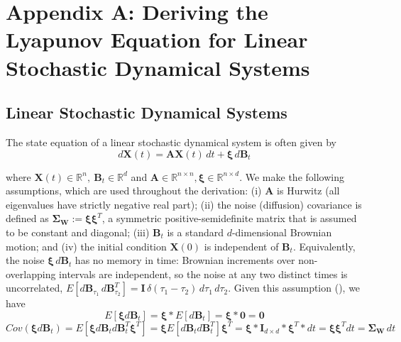 \documentclass{article}
\begin{document}

\section*{Appendix A: Deriving the Lyapunov Equation for Linear Stochastic Dynamical Systems}
\label{app:appA}
\renewcommand{\theequation}{A-\arabic{equation}}
\setcounter{equation}{0}

\subsection*{Linear Stochastic Dynamical Systems}
%
The state equation of a linear stochastic dynamical system is often given by
\begin{equation}
d \mathbf{X}(t) = \mathbf{A} \mathbf{X}(t)\, dt + \boldsymbol{\xi} \, d\mathbf{B}_t
\label{eq:lds_state_eq}
\end{equation}

where $\mathbf{X}(t) \in \mathbb{R}^n,\ \mathbf{B}_t \in \mathbb{R}^d$ and
$\mathbf{A} \in \mathbb{R}^{n \times n} , \boldsymbol{\xi} \in \mathbb{R}^{n \times d}$. We make the following assumptions, which are used throughout the
derivation: (i) $\mathbf{A}$ is Hurwitz (all eigenvalues
have strictly negative real part); (ii) the noise (diffusion) covariance is defined as
$\mathbf{\Sigma}_\mathbf{W}:=\boldsymbol{\xi}\boldsymbol{\xi}^T$, a symmetric
positive-semidefinite matrix that is assumed to be constant and diagonal; (iii) $\mathbf{B}_t$ is a standard $d$-dimensional Brownian motion; and (iv) the initial condition $\mathbf{X}(0)$ is independent of $\mathbf{B}_t$. Equivalently, the noise $\boldsymbol{\xi}\,d\mathbf{B}_t$ has no memory in time: Brownian increments over non-overlapping intervals are independent, so the noise at any two distinct times is uncorrelated, $E[d\mathbf{B}_{\tau_1}\,d\mathbf{B}_{\tau_2}^T]=\mathbf{I}\,\delta(\tau_1-\tau_2)\,d\tau_1\,d\tau_2$. Given this assumption (\citealp[\S1.3]{Pavliotis2014}), we have
%
\begin{equation}
E[\boldsymbol{\xi} d\mathbf{B}_t]=\boldsymbol{\xi} * E[d\mathbf{B}_t]=\boldsymbol{\xi}*\mathbf{0}=\mathbf{0}
\label{eq:noise_mean}
\end{equation}
%
\begin{equation}
Cov(\boldsymbol{\xi} d\mathbf{B}_t)=E[\boldsymbol{\xi} d\mathbf{B}_t d\mathbf{B}^T_t \boldsymbol{\xi}^T]
=\boldsymbol{\xi} E[d\mathbf{B}_t d\mathbf{B}^T_t] \boldsymbol{\xi}^T=
\boldsymbol{\xi} * \mathbf{I}_{d \times d}* \boldsymbol{\xi}^T * dt=\boldsymbol{\xi}\boldsymbol{\xi}^T dt=\mathbf{\Sigma}_\mathbf{W}\, dt
\label{eq:noise_cov}
\end{equation}
\end{document}
